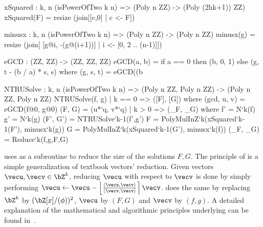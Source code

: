 \begin{code}
  xSquared : {k, n} (isPowerOfTwo k n) => (Poly n ZZ) -> (Poly (2^^(k+1)) ZZ)
  xSquared(F) = resize (join[[c,0] | c <- F])

  minusx : {k, n} (isPowerOfTwo k n) => (Poly n ZZ) -> (Poly n ZZ)
  minusx(g) = resize (join[ [g@i, -(g@(i+1))] | i <- [0, 2 .. (n-1)]])

  eGCD : (ZZ, ZZ) -> (ZZ, ZZ, ZZ)
  eGCD(a, b) =
    if a == 0
    then (b, 0, 1)
    else (g, t - (b / a) * s, s) where
      (g, s, t) = eGCD((b%

  NTRUSolve : {k, n} (isPowerOfTwo k n) =>
    (Poly n ZZ, Poly n ZZ) -> (Poly n ZZ, Poly n ZZ)
  NTRUSolve(f, g)
    | k == 0 => ([F], [G]) where
        (gcd, u, v) = eGCD(f@0, g@0)
        (F, G) = (u*`q, v*`q)
    | k >  0 => (_F, _G) where
        f' = N`{k}(f)
        g' = N`{k}(g)
        (F', G') = NTRUSolve`{k-1}(f',g')
        F = PolyMulInZ`{k}(xSquared`{k-1}(F'), minusx`{k}(g))
        G = PolyMulInZ`{k}(xSquared`{k-1}(G'), minusx`{k}(f))
        (_F, _G) = Reduce`{k}(f,g,F,G)
\end{code}

 \ntrusolve uses \longreduce as a subroutine to reduce the size of the solutions $F,G$.
 The principle of \reduce is a simple generalization of textbook vectors' reduction. Given vectors $\vecu, \vecv \in \bZ^k$, reducing $\vecu$ with respect to $\vecv$ is done by simply performing $\vecu \gets \vecu - \left\lfloor \frac{ \inner{\vecu}{\vecv} }{ \inner{\vecv}{\vecv} } \right\rceil \vecv$. \reduce does the same by replacing $\bZ^k$ by $(\bZ[x]/(\phi))^2$, $\vecu$ by $(F,G)$ and $\vecv$ by $ (f,g)$. A detailed explanation of the mathematical and algorithmic principles underlying \ntrusolve can be found in~\cite{PKC:PorPre19}.

  \begin{algorithm}[!htp]
  \caption{$\reduce(f,g,F,G)$}\label{alg:reduce}
 \begin{algorithmic}[1]

  \Do
  \end{algorithmic}
 \end{algorithm}

